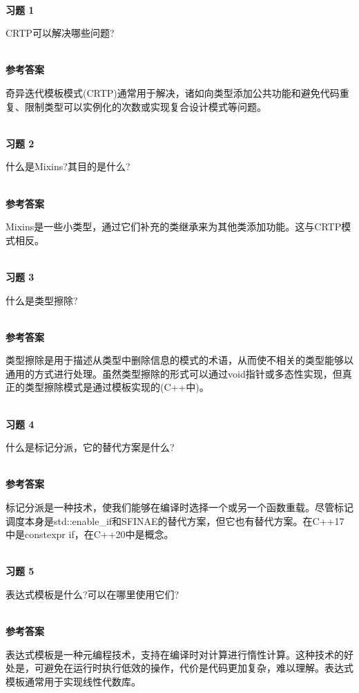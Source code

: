 \hspace*{\fill} \\ %
\noindent
\textbf{习题 1}

CRTP可以解决哪些问题?

\hspace*{\fill} \\ %
\noindent
\textbf{参考答案}

奇异迭代模板模式(CRTP)通常用于解决，诸如向类型添加公共功能和避免代码重复、限制类型可以实例化的次数或实现复合设计模式等问题。


\hspace*{\fill} \\ %
\noindent
\textbf{习题 2}

什么是Mixins?其目的是什么?

\hspace*{\fill} \\ %
\noindent
\textbf{参考答案}

Mixins是一些小类型，通过它们补充的类继承来为其他类添加功能。这与CRTP模式相反。

\hspace*{\fill} \\ %
\noindent
\textbf{习题 3}

什么是类型擦除?

\hspace*{\fill} \\ %
\noindent
\textbf{参考答案}

类型擦除是用于描述从类型中删除信息的模式的术语，从而使不相关的类型能够以通用的方式进行处理。虽然类型擦除的形式可以通过void指针或多态性实现，但真正的类型擦除模式是通过模板实现的(C++中)。

\hspace*{\fill} \\ %
\noindent
\textbf{习题 4}

什么是标记分派，它的替代方案是什么?

\hspace*{\fill} \\ %
\noindent
\textbf{参考答案}

标记分派是一种技术，使我们能够在编译时选择一个或另一个函数重载。尽管标记调度本身是std::enable\_if和SFINAE的替代方案，但它也有替代方案。在C++17中是constexpr if，在C++20中是概念。

\hspace*{\fill} \\ %
\noindent
\textbf{习题 5}

表达式模板是什么?可以在哪里使用它们?

\hspace*{\fill} \\ %
\noindent
\textbf{参考答案}

表达式模板是一种元编程技术，支持在编译时对计算进行惰性计算。这种技术的好处是，可避免在运行时执行低效的操作，代价是代码更加复杂，难以理解。表达式模板通常用于实现线性代数库。












